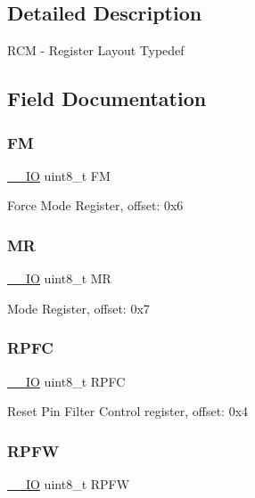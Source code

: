 \subsection{Detailed Description}
R\+CM -\/ Register Layout Typedef 

\subsection{Field Documentation}
\mbox{\label{struct_r_c_m___type_a9dc688d824bd4fbad7ae0cbf014ab941}} 
\subsubsection{\texorpdfstring{FM}{FM}}
{\footnotesize\ttfamily \mbox{\hyperlink{core__cm0plus_8h_aec43007d9998a0a0e01faede4133d6be}{\+\_\+\+\_\+\+IO}} uint8\+\_\+t FM}

Force Mode Register, offset\+: 0x6 \mbox{\label{struct_r_c_m___type_a91433e592a086af139d7860f6a37b723}} 
\subsubsection{\texorpdfstring{MR}{MR}}
{\footnotesize\ttfamily \mbox{\hyperlink{core__cm0plus_8h_aec43007d9998a0a0e01faede4133d6be}{\+\_\+\+\_\+\+IO}} uint8\+\_\+t MR}

Mode Register, offset\+: 0x7 \mbox{\label{struct_r_c_m___type_adb3a6cb8a3c37e9a55ab12962d0983d1}} 
\subsubsection{\texorpdfstring{RPFC}{RPFC}}
{\footnotesize\ttfamily \mbox{\hyperlink{core__cm0plus_8h_aec43007d9998a0a0e01faede4133d6be}{\+\_\+\+\_\+\+IO}} uint8\+\_\+t R\+P\+FC}

Reset Pin Filter Control register, offset\+: 0x4 \mbox{\label{struct_r_c_m___type_a9423324babed28ac7e0a6990356c8cb1}} 
\subsubsection{\texorpdfstring{RPFW}{RPFW}}
{\footnotesize\ttfamily \mbox{\hyperlink{core__cm0plus_8h_aec43007d9998a0a0e01faede4133d6be}{\+\_\+\+\_\+\+IO}} uint8\+\_\+t R\+P\+FW}

